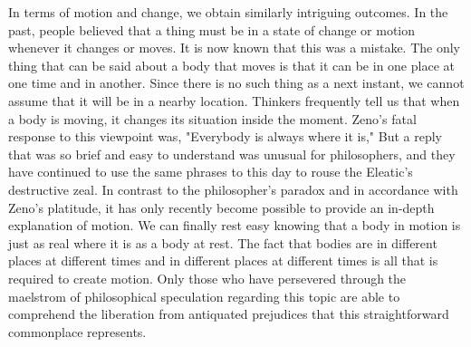 \documentclass[a4paper,12pt]{book}[2004/02/16]
\theoremstyle{ilemma}
\theoremstyle{itheorem}
\theoremstyle{iother}
\theoremstyle{icorollary}
\theoremstyle{numcorollary}
\theoremstyle{idefinition}
\begin{document}
In terms of motion and change, we obtain similarly intriguing outcomes. In the past, people believed that a thing must be in a state of change or motion whenever it changes or moves. It is now known that this was a mistake. The only thing that can be said about a body that moves is that it can be in one place at one time and in another. Since there is no such thing as a next instant, we cannot assume that it will be in a nearby location. Thinkers frequently tell us
that when a body is moving, it changes its situation inside the
moment. Zeno's fatal response to this viewpoint was, "Everybody is always where it is," But a reply that was so brief and easy to understand was unusual for philosophers, and they have continued to use the same phrases to this day to rouse the Eleatic's destructive zeal. In contrast to the philosopher's paradox and in accordance with Zeno's platitude, it has only recently become possible to provide an in-depth explanation of motion. We can finally rest easy knowing that a body in motion is just as real where it is as a body at rest. The fact that bodies are in different places at different times and in different places at different times is all that is required to create motion. Only those who have persevered through the maelstrom of philosophical speculation regarding this topic are able to comprehend the liberation from antiquated prejudices that this straightforward commonplace represents.
\end{document}
